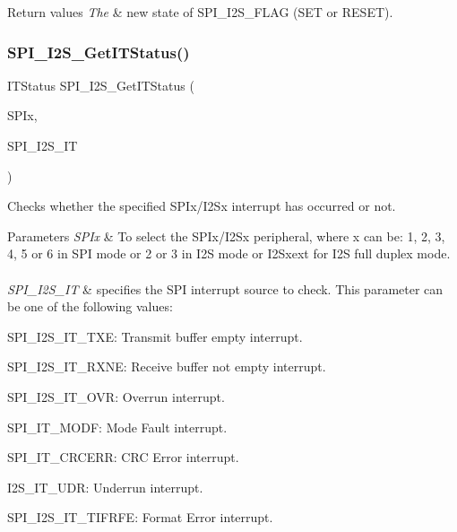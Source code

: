 \begin{DoxyRetVals}{Return values}
{\em The} & new state of S\+P\+I\+\_\+\+I2\+S\+\_\+\+F\+L\+AG (S\+ET or R\+E\+S\+ET). \\
\hline
\end{DoxyRetVals}
\mbox{\label{group___s_p_i___group5_ga72decbc1cd79f8fad92a2204beca6bc5}} 
\subsubsection{\texorpdfstring{S\+P\+I\+\_\+\+I2\+S\+\_\+\+Get\+I\+T\+Status()}{SPI\_I2S\_GetITStatus()}}
{\footnotesize\ttfamily I\+T\+Status S\+P\+I\+\_\+\+I2\+S\+\_\+\+Get\+I\+T\+Status (\begin{DoxyParamCaption}\item[{S\+P\+I\+\_\+\+Type\+Def $\ast$}]{S\+P\+Ix,  }\item[{uint8\+\_\+t}]{S\+P\+I\+\_\+\+I2\+S\+\_\+\+IT }\end{DoxyParamCaption})}



Checks whether the specified S\+P\+Ix/\+I2\+Sx interrupt has occurred or not. 


\begin{DoxyParams}{Parameters}
{\em S\+P\+Ix} & To select the S\+P\+Ix/\+I2\+Sx peripheral, where x can be\+: 1, 2, 3, 4, 5 or 6 in S\+PI mode or 2 or 3 in I2S mode or I2\+Sxext for I2S full duplex mode. ~\newline
\\
\hline
{\em S\+P\+I\+\_\+\+I2\+S\+\_\+\+IT} & specifies the S\+PI interrupt source to check. This parameter can be one of the following values\+: \begin{DoxyItemize}
\item S\+P\+I\+\_\+\+I2\+S\+\_\+\+I\+T\+\_\+\+T\+XE\+: Transmit buffer empty interrupt. \item S\+P\+I\+\_\+\+I2\+S\+\_\+\+I\+T\+\_\+\+R\+X\+NE\+: Receive buffer not empty interrupt. \item S\+P\+I\+\_\+\+I2\+S\+\_\+\+I\+T\+\_\+\+O\+VR\+: Overrun interrupt. \item S\+P\+I\+\_\+\+I\+T\+\_\+\+M\+O\+DF\+: Mode Fault interrupt. \item S\+P\+I\+\_\+\+I\+T\+\_\+\+C\+R\+C\+E\+RR\+: C\+RC Error interrupt. \item I2\+S\+\_\+\+I\+T\+\_\+\+U\+DR\+: Underrun interrupt. ~\newline
 \item S\+P\+I\+\_\+\+I2\+S\+\_\+\+I\+T\+\_\+\+T\+I\+F\+R\+FE\+: Format Error interrupt. ~\newline
\end{DoxyItemize}
\\
\hline
\end{DoxyParams}

